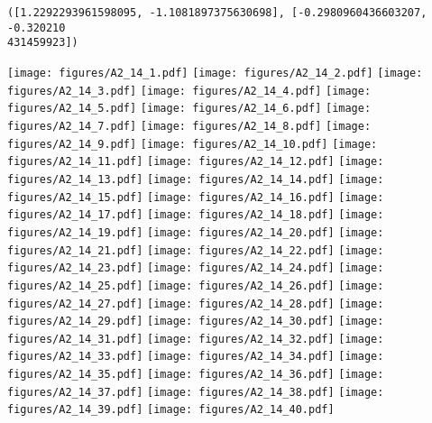 \documentclass[12pt,a4paper]{article}
\begin{document}
\begin{lstlisting}
([1.2292293961598095, -1.1081897375630698], [-0.2980960436603207, -0.320210
431459923])
\end{lstlisting}

\texttt{[image: figures/A2\_14\_1.pdf]}
\texttt{[image: figures/A2\_14\_2.pdf]}
\texttt{[image: figures/A2\_14\_3.pdf]}
\texttt{[image: figures/A2\_14\_4.pdf]}
\texttt{[image: figures/A2\_14\_5.pdf]}
\texttt{[image: figures/A2\_14\_6.pdf]}
\texttt{[image: figures/A2\_14\_7.pdf]}
\texttt{[image: figures/A2\_14\_8.pdf]}
\texttt{[image: figures/A2\_14\_9.pdf]}
\texttt{[image: figures/A2\_14\_10.pdf]}
\texttt{[image: figures/A2\_14\_11.pdf]}
\texttt{[image: figures/A2\_14\_12.pdf]}
\texttt{[image: figures/A2\_14\_13.pdf]}
\texttt{[image: figures/A2\_14\_14.pdf]}
\texttt{[image: figures/A2\_14\_15.pdf]}
\texttt{[image: figures/A2\_14\_16.pdf]}
\texttt{[image: figures/A2\_14\_17.pdf]}
\texttt{[image: figures/A2\_14\_18.pdf]}
\texttt{[image: figures/A2\_14\_19.pdf]}
\texttt{[image: figures/A2\_14\_20.pdf]}
\texttt{[image: figures/A2\_14\_21.pdf]}
\texttt{[image: figures/A2\_14\_22.pdf]}
\texttt{[image: figures/A2\_14\_23.pdf]}
\texttt{[image: figures/A2\_14\_24.pdf]}
\texttt{[image: figures/A2\_14\_25.pdf]}
\texttt{[image: figures/A2\_14\_26.pdf]}
\texttt{[image: figures/A2\_14\_27.pdf]}
\texttt{[image: figures/A2\_14\_28.pdf]}
\texttt{[image: figures/A2\_14\_29.pdf]}
\texttt{[image: figures/A2\_14\_30.pdf]}
\texttt{[image: figures/A2\_14\_31.pdf]}
\texttt{[image: figures/A2\_14\_32.pdf]}
\texttt{[image: figures/A2\_14\_33.pdf]}
\texttt{[image: figures/A2\_14\_34.pdf]}
\texttt{[image: figures/A2\_14\_35.pdf]}
\texttt{[image: figures/A2\_14\_36.pdf]}
\texttt{[image: figures/A2\_14\_37.pdf]}
\texttt{[image: figures/A2\_14\_38.pdf]}
\texttt{[image: figures/A2\_14\_39.pdf]}
\texttt{[image: figures/A2\_14\_40.pdf]}
\end{document}
